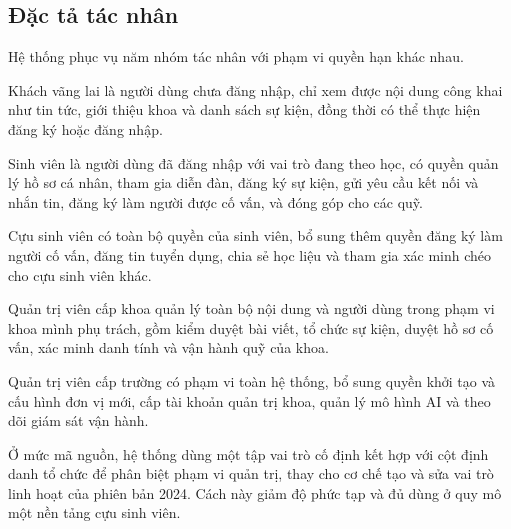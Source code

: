 \documentclass[12pt,a4paper,oneside]{report}
\begin{document}
\subsection{Đặc tả tác nhân}

Hệ thống phục vụ năm nhóm tác nhân với phạm vi quyền hạn khác nhau.

Khách vãng lai là người dùng chưa đăng nhập, chỉ xem được nội dung công khai như tin tức, giới thiệu khoa và danh sách sự kiện, đồng thời có thể thực hiện đăng ký hoặc đăng nhập.

Sinh viên là người dùng đã đăng nhập với vai trò đang theo học, có quyền quản lý hồ sơ cá nhân, tham gia diễn đàn, đăng ký sự kiện, gửi yêu cầu kết nối và nhắn tin, đăng ký làm người được cố vấn, và đóng góp cho các quỹ.

Cựu sinh viên có toàn bộ quyền của sinh viên, bổ sung thêm quyền đăng ký làm người cố vấn, đăng tin tuyển dụng, chia sẻ học liệu và tham gia xác minh chéo cho cựu sinh viên khác.

Quản trị viên cấp khoa quản lý toàn bộ nội dung và người dùng trong phạm vi khoa mình phụ trách, gồm kiểm duyệt bài viết, tổ chức sự kiện, duyệt hồ sơ cố vấn, xác minh danh tính và vận hành quỹ của khoa.

Quản trị viên cấp trường có phạm vi toàn hệ thống, bổ sung quyền khởi tạo và cấu hình đơn vị mới, cấp tài khoản quản trị khoa, quản lý mô hình AI và theo dõi giám sát vận hành.

Ở mức mã nguồn, hệ thống dùng một tập vai trò cố định kết hợp với cột định danh tổ chức để phân biệt phạm vi quản trị, thay cho cơ chế tạo và sửa vai trò linh hoạt của phiên bản 2024. Cách này giảm độ phức tạp và đủ dùng ở quy mô một nền tảng cựu sinh viên.
\end{document}
